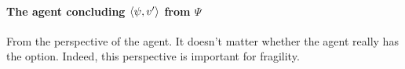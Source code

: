 \paragraph*{The agent concluding \(\langle \psi, v' \rangle\) from \(\Psi\)}

\begin{note}
  From the perspective of the agent.
  It doesn't matter whether the agent really has the option.
  Indeed, this perspective is important for fragility.
\end{note}




